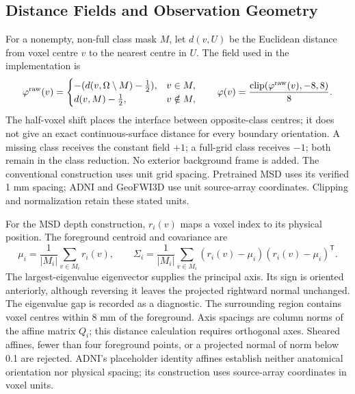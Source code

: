 \documentclass[12pt,a4paper]{article}
\begin{document}
\subsection{Distance Fields and Observation Geometry}
\label{sec:sdf-construction-details}

For a nonempty, non-full class mask $M$, let $d(v,U)$ be the Euclidean
distance from voxel centre $v$ to the nearest centre in $U$. The field
used in the implementation is
\begin{equation}
\varphi^{\rm raw}(v)=
\begin{cases}
-(d(v,\Omega\setminus M)-\tfrac12), & v\in M,\\
d(v,M)-\tfrac12, & v\notin M,
\end{cases}
\qquad
\varphi(v)=\frac{\operatorname{clip}(\varphi^{\rm raw}(v),-8,8)}{8}.
\label{eq:sdf-half-voxel-field}
\end{equation}
The half-voxel shift places the interface between opposite-class
centres; it does not give an exact continuous-surface distance for every
boundary orientation. A missing class receives the constant field $+1$;
a full-grid class receives $-1$; both remain in the class reduction.
No exterior background frame is added. The conventional construction uses unit grid
spacing. Pretrained MSD uses its verified 1 mm spacing; ADNI and
GeoFWI3D use unit source-array coordinates. Clipping and normalization
retain these stated units.

For the MSD depth construction, $r_i(v)$ maps a voxel index to its
physical position. The foreground centroid and covariance are
\begin{equation}
\mu_i=\frac{1}{|M_i|}\sum_{v\in M_i}r_i(v),\qquad
\Sigma_i=\frac{1}{|M_i|}\sum_{v\in M_i}
(r_i(v)-\mu_i)(r_i(v)-\mu_i)^{\mathsf T}.
\label{eq:depth-centroid-covariance}
\end{equation}
The largest-eigenvalue eigenvector supplies the principal axis. Its
sign is oriented anteriorly, although reversing it leaves the projected
rightward normal unchanged. The eigenvalue gap is recorded as a
diagnostic. The surrounding region contains voxel centres within
8 mm of the foreground. Axis spacings are column norms of the affine
matrix $Q_i$; this distance calculation requires orthogonal axes.
Sheared affines, fewer than four foreground points, or a projected
normal of norm below 0.1 are rejected. ADNI's placeholder identity
affines establish neither anatomical orientation nor physical spacing;
its construction uses source-array coordinates in voxel units.
\end{document}
